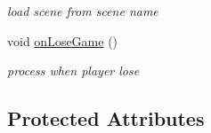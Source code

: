 \begin{DoxyCompactItemize}
\begin{DoxyCompactList}\small\item\em load scene from scene name \end{DoxyCompactList}\item 
void \hyperlink{class_basic_tutorial__00_abaf653f7f04698804387dce117bbec10}{on\+Lose\+Game} ()\hypertarget{class_basic_tutorial__00_abaf653f7f04698804387dce117bbec10}{}\label{class_basic_tutorial__00_abaf653f7f04698804387dce117bbec10}

\begin{DoxyCompactList}\small\item\em process when player lose \end{DoxyCompactList}\end{DoxyCompactItemize}
\subsection*{Protected Attributes}
